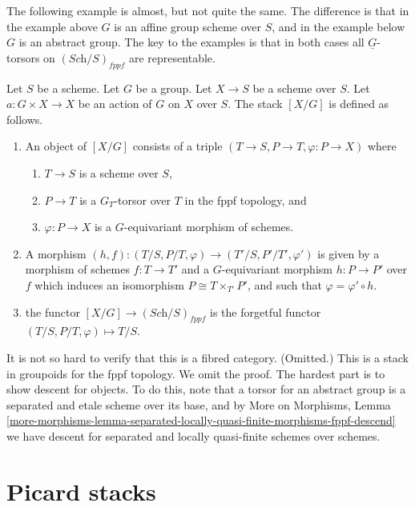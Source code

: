 \noindent
The following example is almost, but not quite the same.
The difference is that in the example above $G$ is an affine group scheme
over $S$, and in the example below $G$ is an abstract group.
The key to the examples is that in both cases all
$\underline{G}$-torsors on $(\textit{Sch}/S)_{fppf}$ are representable.

\begin{example}
\label{example-X-mod-G-group}
Let $S$ be a scheme.
Let $G$ be a group.
Let $X \to S$ be a scheme over $S$.
Let $a : G \times X \to X$ be an action of $G$ on $X$ over $S$.
The stack $[X/G]$ is defined as follows.
\begin{enumerate}
\item An object of $[X/G]$ consists of a triple
$(T \to S, P \to T, \varphi : P \to X)$ where
\begin{enumerate}
\item $T \to S$ is a scheme over $S$,
\item $P \to T$ is a $G_T$-torsor over $T$ in the fppf topology, and
\item $\varphi : P \to X$ is a $G$-equivariant morphism of schemes.
\end{enumerate}
\item A morphism
$(h, f) : (T/S, P/T, \varphi) \to (T'/S, P'/T', \varphi')$
is given by a morphism of schemes $f : T \to T'$ and a $G$-equivariant
morphism $h : P \to P'$ over $f$ which induces an isomorphism
$P \cong T \times_{T'} P'$, and such that $\varphi = \varphi' \circ h$.
\item the functor $[X/G] \to (\textit{Sch}/S)_{fppf}$ is the forgetful
functor $(T/S, P/T, \varphi) \mapsto T/S$.
\end{enumerate}
It is not so hard to verify that this is a fibred category. (Omitted.)
This is a stack in groupoids for the fppf topology. We omit the proof.
The hardest part is to show descent for objects.
To do this, note that a torsor for an abstract group
is a separated and etale scheme over its base, and by
More on Morphisms, Lemma
\ref{more-morphisms-lemma-separated-locally-quasi-finite-morphisms-fppf-descend}
we have descent for separated and locally quasi-finite schemes over schemes.
\end{example}



\section{Picard stacks}
\label{section-picard-stack}

